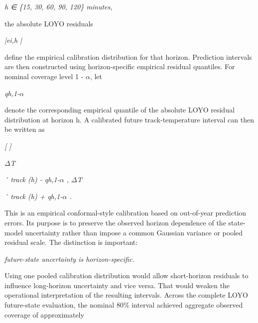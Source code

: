 \begin{center}\textit{h ∈ \{15, 30, 60, 90, 120\} minutes,}\end{center}

the absolute LOYO residuals

\begin{center}\textit{|ei,h |}\end{center}

define the empirical calibration distribution for that horizon. Prediction intervals are then constructed using horizon-specific empirical residual quantiles. For nominal coverage level 1 - \ensuremath{\alpha}, let

\begin{center}\textit{qh,1-\ensuremath{\alpha}}\end{center}

denote the corresponding empirical quantile of the absolute LOYO residual distribution at horizon h. A calibrated future track-temperature interval can then be written as

\begin{center}\textit{[                                                ]}\end{center}

\begin{center}\textit{\ensuremath{\Delta}T}\end{center}

\begin{center}\textit{ˆ track (h) - qh,1-\ensuremath{\alpha} , \ensuremath{\Delta}T}\end{center}

\begin{center}\textit{ˆ track (h) + qh,1-\ensuremath{\alpha} .}\end{center}

This is an empirical conformal-style calibration based on out-of-year prediction errors. Its purpose is to preserve the observed horizon dependence of the state-model uncertainty rather than impose a common Gaussian variance or pooled residual scale. The distinction is important:

\begin{center}\textit{future-state uncertainty is horizon-specific.}\end{center}

Using one pooled calibration distribution would allow short-horizon residuals to influence long-horizon uncertainty and vice versa. That would weaken the operational interpretation of the resulting intervals. Across the complete LOYO future-state evaluation, the nominal 80\% interval achieved aggregate observed coverage of approximately

